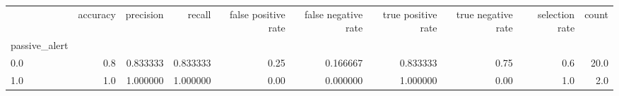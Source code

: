 \begin{tabular}{lrrrrrrrrr}
\toprule
{} &  accuracy &  precision &    recall &  false positive rate &  false negative rate &  true positive rate &  true negative rate &  selection rate &  count \\
passive\_alert &           &            &           &                      &                      &                     &                     &                 &        \\
\midrule
0.0           &       0.8 &   0.833333 &  0.833333 &                 0.25 &             0.166667 &            0.833333 &                0.75 &             0.6 &   20.0 \\
1.0           &       1.0 &   1.000000 &  1.000000 &                 0.00 &             0.000000 &            1.000000 &                0.00 &             1.0 &    2.0 \\
\bottomrule
\end{tabular}
